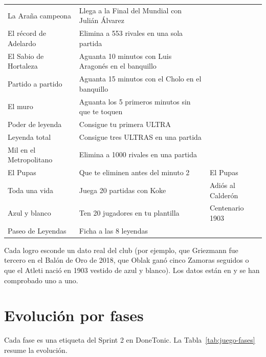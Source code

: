 \begin{longtable}{@{}L{2.2cm} L{4.5cm} L{2.8cm}@{}}
La Araña campeona & Llega a la Final del Mundial con Julián Álvarez &  \\
El récord de Adelardo & Elimina a 553 rivales en una sola partida &  \\
El Sabio de Hortaleza & Aguanta 10 minutos con Luis Aragonés en el banquillo &  \\
Partido a partido & Aguanta 15 minutos con el Cholo en el banquillo &  \\
El muro & Aguanta los 5 primeros minutos sin que te toquen &  \\
Poder de leyenda & Consigue tu primera ULTRA &  \\
Leyenda total & Consigue tres ULTRAS en una partida &  \\
Mil en el Metropolitano & Elimina a 1000 rivales en una partida &  \\
El Pupas & Que te eliminen antes del minuto 2 & El Pupas \\
Toda una vida & Juega 20 partidas con Koke & Adiós al Calderón \\
Azul y blanco & Ten 20 jugadores en tu plantilla & Centenario 1903 \\
Paseo de Leyendas & Ficha a las 8 leyendas &  \\*
\bottomrule
\end{longtable}

Cada logro esconde un dato real del club (por ejemplo, que Griezmann fue tercero en el Balón de Oro de 2018, que Oblak ganó cinco Zamoras seguidos o que el Atleti nació en 1903 vestido de azul y blanco). Los datos están en  y se han comprobado uno a uno.

\section{Evolución por fases}
\label{sec:juego-evolucion}

Cada fase es una etiqueta del Sprint 2 en DoneTonic. La Tabla~\ref{tab:juego-fases} resume la evolución.

